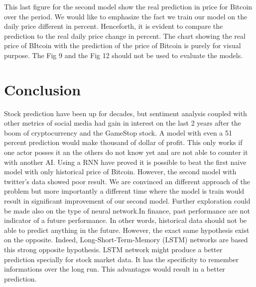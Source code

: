 \documentclass[conference]{IEEEtran}
\begin{document}
This last figure for the second model show the real prediction in price for Bitcoin over the period.\newline
\newline
We would like to emphasize the fact we train our model on the daily price different in percent. Henceforth, it is evident to compare the prediction to the real daily price change in percent. The chart showing the real price of BItcoin with the prediction of the price of Bitcoin is purely for visual purpose. The Fig 9 and the Fig 12 should not be used to evaluate the models.


\section{Conclusion}
Stock prediction have been up for decades, but sentiment analysis coupled with other metrics of social media had gain in interest on the last 2 years after the boom of cryptocurrency  and the GameStop stock. A model with even a 51 percent prediction would make thousand of dollar of profit. This only works if one actor posses it an the others do not know yet and are not able to counter it with another AI.\newline
\newline
Using a RNN have proved it is possible to beat the first naive model with only historical price of Bitcoin. However, the second model with twitter's data showed poor result. We are convinced an different approach of the problem but more importantly  a different time where the model is train would result in significant improvement of our second model.\newline
\newline
Further exploration could be made also on the type of neural network.In finance, past performance are not indicator of a future performance. In other words, historical data should not be able to predict anything in the future. However, the exact same hypothesis exist on the opposite. Indeed, Long-Short-Term-Memory (LSTM) networks are based this strong opposite hypothesis. LSTM network might produce a better prediction specially for stock market data. It has the specificity to remember informations over the long run. This advantages would result in a better prediction.
\end{document}
